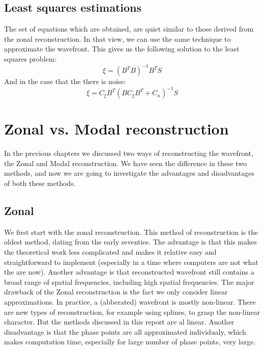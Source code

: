 \documentclass{article}
\begin{document}
\subsection{Least squares estimations}
The set of equations which are obtained, are quiet similar to those derived from the zonal reconstruction. In that view, we can use the same technique to approximate the wavefront. This gives us the following solution to the least squares problem:
$$
\hat{\xi} = (B^TB)^{-1}B^TS 
$$
And in the case that the there is noise:
$$
\hat{\xi} = C_\xi B^T(BC_\xi B^T + C_n)^{-1}S
$$

\section{Zonal vs. Modal reconstruction}
In the previous chapters we discussed two ways of reconstructing the wavefront, the Zonal and Modal reconstruction. We have seen the difference in these two methods, and now we are going to investigate the advantages and disadvantages of both these methods.

\subsection{Zonal}
We first start with the zonal reconstruction. This method of reconstruction is the oldest method, dating from the early seventies. The advantage is that this makes the theoretical work less complicated and makes it relative easy and straightforward to implement (especially in a time where computers are not what the are now). Another advantage is that reconstructed wavefront still contains a broad range of spatial frequencies, including high spatial frequencies. 
\newline
\newline
The major drawback of the Zonal reconstruction is the fact we only consider linear approximations. In practice, a (abberated) wavefront is mostly non-linear. There are new types of reconstruction, for example using splines, to grasp the non-linear character. But the methods discussed in this report are al linear. Another disadvantage is that the phase points are all approximated individualy, which makes computation time, especially for large number of phase points, very large.
\end{document}
